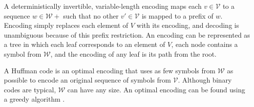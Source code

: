 A deterministically invertible, variable-length encoding maps each
$v\in\mathcal{V}$ to a sequence $w \in \mathcal{W}+$ such that no other
$v'\in\mathcal{V}$ is mapped to a prefix of $w$. Encoding simply replaces each
element of $V$ with its encoding, and decoding is unambiguous because of this
prefix restriction. An encoding can be represented as a tree in which each leaf
corresponds to an element of $V$, each node contains a symbol from
$\mathcal{W}$, and the encoding of any leaf is its path from the root.

A Huffman code is an optimal encoding that uses as few symbols from
$\mathcal{W}$ as possible to encode an original sequence of symbols from
$\mathcal{V}$. Although binary codes are typical, $\mathcal{W}$ can have any
size. An optimal encoding can be found using a greedy algorithm
\cite{huffman}.
